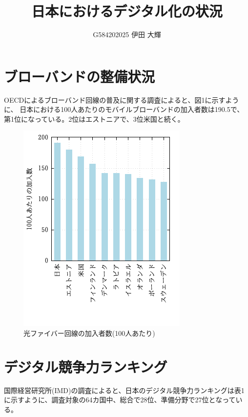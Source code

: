 \documentclass[a4paper,11pt,dvipdfmx]{ujarticle}
\title{日本におけるデジタル化の状況}
\author{G584202025 伊田 大輝}
\begin{document}
\maketitle

\section{ブローバンドの整備状況}

OECDによるブローバンド回線の普及に関する調査\cite{oecd}によると、図1に示すように、
日本における100人あたりのモバイルブローバンドの加入者数は190.5で、
第1位になっている。2位はエストニアで、3位米国と続く。




\begin{figure}[htbp]
    \centering
    \includegraphics{abc.png}
    \caption{光ファイバー回線の加入者数(100人あたり)}\label{図1}
\end{figure}
\section{デジタル競争力ランキング}

国際経営研究所(IMD)の調査\cite{imd}によると、日本のデジタル競争力ランキングは表1
に示すように、調査対象の64カ国中、総合で28位、準備分野で27位となっている。
\end{document}
